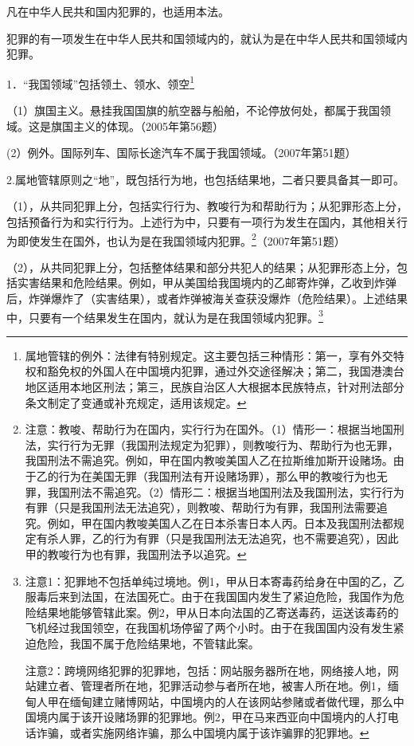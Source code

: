 凡在中华人民共和国内犯罪的，也适用本法。

犯罪的有一项发生在中华人民共和国领域内的，就认为是在中华人民共和国领域内犯罪。

1．“我国领域”包括领土、领水、领空\footnote{属地管辖的例外：法律有特别规定。这主要包括三种情形：第一，享有外交特权和豁免权的外国人在中国境内犯罪，通过外交途径解决；第二，我国港澳台地区适用本地区刑法；第三，民族自治区人大根据本民族特点，针对刑法部分条文制定了变通或补充规定，适用该规定。}

（1）旗国主义。悬挂我国国旗的航空器与船舶，不论停放何处，都属于我国领域。这是旗国主义的体现。（2005年第56题）

(2）例外。国际列车、国际长途汽车不属于我国领域。（2007年第51题）

2.属地管辖原则之“地”，既包括行为地，也包括结果地，二者只要具备其一即可。

（1），从共同犯罪上分，包括实行行为、教唆行为和帮助行为；从犯罪形态上分，包括预备行为和实行行为。上述行为中，只要有一项行为发生在国内，其他相关行为即使发生在国外，也认为是在我国领域内犯罪。\footnote{注意：教唆、帮助行为在国内，实行行为在国外。（1）情形一：根据当地国刑法，实行行为无罪（我国刑法规定为犯罪），则教唆行为、帮助行为也无罪，我国刑法不需追究。例如，甲在国内教唆美国人乙在拉斯维加斯开设赌场。由于乙的行为在美国无罪（我国刑法有开设赌场罪），那么甲的教唆行为也无罪，我国刑法不需追究。（2）情形二：根据当地国刑法及我国刑法，实行行为有罪（只是我国刑法无法追究），则教唆、帮助行为有罪，我国刑法需要追究。例如，甲在国内教唆美国人乙在日本杀害日本人丙。日本及我国刑法都规定有杀人罪，乙的行为有罪（只是我国刑法无法追究，也不需要追究），因此甲的教唆行为也有罪，我国刑法予以追究。}（2007年第51题）

（2），从共同犯罪上分，包括整体结果和部分共犯人的结果；从犯罪形态上分，包括实害结果和危险结果。例如，甲从美国给我国境内的乙邮寄炸弹，乙收到炸弹后，炸弹爆炸了（实害结果），或者炸弹被海关查获没爆炸（危险结果）。上述结果中，只要有一个结果发生在国内，就认为是在我国领域内犯罪。\footnote{注意1：犯罪地不包括单纯过境地。例1，甲从日本寄毒药给身在中国的乙，乙服毒后来到法国，在法国死亡。由于在我国国内发生了紧迫危险，我国作为危险结果地能够管辖此案。例2，甲从日本向法国的乙寄送毒药，运送该毒药的飞机经过我国领空，在我国机场停留了两个小时。由于在我国国内没有发生紧迫危险，我国不属于危险结果地，不管辖此案。

注意2：跨境网络犯罪的犯罪地，包括：网站服务器所在地，网络接人地，网站建立者、管理者所在地，犯罪活动参与者所在地，被害人所在地。例1，缅甸人甲在缅甸建立赌博网站，中国境内的人在该网站参赌或者做代理，那么中国境内属于该开设赌场罪的犯罪地。例2，甲在马来西亚向中国境内的人打电话诈骗，或者实施网络诈骗，那么中国境内属于该诈骗罪的犯罪地。}

